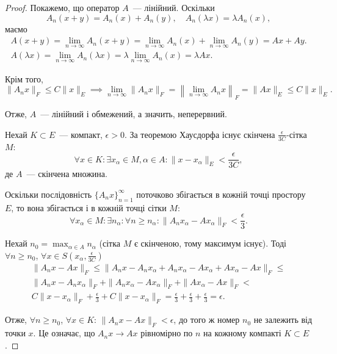 \begin{proof}
Покажемо, що оператор $A$~--- лінійний. Оскільки
\begin{equation*}
    A_n(x + y) = A_n(x) + A_n(y), \quad A_n(\lambda x) = \lambda A_n(x),
\end{equation*}
маємо
\begin{gather*}
    A(x + y) =
    \lim_{n \to \infty} A_n(x + y) =
    \lim_{n \to \infty} A_n(x) + \lim_{n \to \infty} A_n(y) =
    A x + A y. \\
    A(\lambda x) =
    \lim_{n \to \infty} A_n(\lambda x) =
    \lambda \lim_{n \to \infty} A_n(x) =
    \lambda A x.
\end{gather*}

Крім того,
\begin{equation*}
    \|A_n x\|_F \le C \|x\|_E \implies
    \lim_{n \to \infty} \|A_n x\|_F =
    \left\| \lim_{n \to \infty} A_n x \right\|_F =
    \|A x\|_E \le C \|x\|_E.
\end{equation*}

Отже, $A$~--- лінійний і обмежений, а значить, неперервний.

Нехай $K \subset E$~--- компакт, $\epsilon > 0$. За теоремою Хаусдорфа
існує скінчена $\frac{\epsilon}{3 C}$-сітка $M$:
\begin{equation*}
    \forall x \in K:
    \exists x_\alpha \in M, \alpha \in A:
    \|x - x_\alpha\|_E < \frac{\epsilon}{3 C},
\end{equation*}
де $A$~--- скінчена множина.

Оскільки послідовність $\{A_n x\}_{n = 1}^\infty$
поточково збігається в
кожній точці простору $E$, то вона збігається і в кожній точці
сітки $M$:
\begin{equation*}
    \forall x_\alpha \in M:
    \exists n_\alpha:
    \forall n \ge n_\alpha:
    \|A_n x_\alpha - A x_\alpha\|_F < \frac{\epsilon}{3}.
\end{equation*}

Нехай $n_0 = \max_{\alpha \in A} n_\alpha$ (сітка $M$ є скінченою, тому максимум існує).
Тоді $\forall n \ge n_0$, $\forall x \in S\left(x_\alpha, \frac{\epsilon}{3C}\right)$
\begin{multline*}
    \|A_n x - A x\|_F \le
    \|A_n x - A_n x_\alpha + A_n x_\alpha - A x_\alpha + A x_\alpha - A x\|_F \le \\
    \|A_n x - A_n x_\alpha\|_F + \|A_n x_\alpha - A x_\alpha\|_F + \|A x_\alpha - A x\|_F < \\
    C \|x - x_\alpha\|_F + \frac{\epsilon}{3} + C \|x - x_\alpha\|_F =
    \frac{\epsilon}{3} + \frac{\epsilon}{3} + \frac{\epsilon}{3} = \epsilon.
\end{multline*}

Отже, $\forall n \ge n_0$, $\forall x \in K$: $\|A_n x - A x\|_F < \epsilon$,
до того ж номер $n_0$ не залежить від точки $x$. Це означає, що
$A_n x \to A x$ рівномірно по $n$ на кожному компакті $K \subset E$.
\end{proof}


